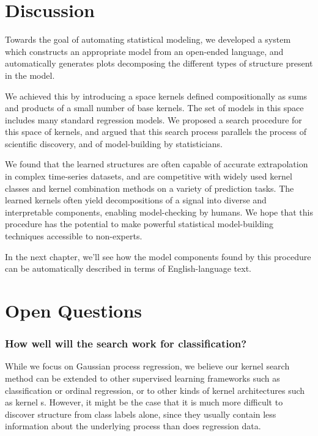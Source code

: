 \section{Discussion}

Towards the goal of automating statistical modeling, we developed a system which constructs an appropriate model from an open-ended language, and automatically generates plots decomposing the different types of structure present in the model.

We achieved this by introducing a space kernels defined compositionally as sums and products of a small number of base kernels.  
The set of models in this space includes many standard regression models.
We proposed a search procedure for this space of kernels, and argued that this search process parallels the process of scientific discovery, and of model-building by statisticians.

We found that the learned structures are often capable of accurate extrapolation in complex time-series datasets, and are competitive with widely used kernel classes and kernel combination methods on a variety of prediction tasks.
The learned kernels often yield decompositions of a signal into diverse and interpretable components, enabling model-checking by humans.
We hope that this procedure has the potential to make powerful statistical model-building techniques accessible to non-experts.

In the next chapter, we'll see how the model components found by this procedure can be automatically described in terms of English-language text.

\iffalse
\section{Open Questions}

\subsubsection{How well will the search work for classification?}
While we focus on Gaussian process regression, we believe our kernel search method can be extended to other supervised learning frameworks such as classification or ordinal regression, or to other kinds of kernel architectures such as kernel \SVM{}s.
However, it might be the case that it is much more difficult to discover structure from class labels alone, since they usually contain less information about the underlying process than does regression data.

